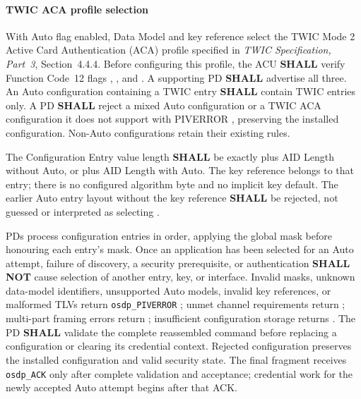\paragraph{TWIC ACA profile selection}
With Auto flag  enabled, Data Model  and key reference
 select the TWIC Mode 2 Active Card Authentication (ACA) profile
specified in \emph{TWIC Specification, Part~3}, Section~4.4.4. Before configuring
this profile, the ACU \textbf{SHALL} verify Function Code~12 flags ,
, and . A supporting PD \textbf{SHALL} advertise all three.
An Auto configuration containing a TWIC entry \textbf{SHALL} contain TWIC entries
only. A PD \textbf{SHALL} reject a mixed Auto configuration or a TWIC ACA
configuration it does not support with PIVERROR , preserving the
installed configuration. Non-Auto configurations retain their existing rules.

The Configuration Entry value length \textbf{SHALL} be exactly  plus AID
Length without Auto, or  plus AID Length with Auto. The key reference belongs
to that entry; there is no configured algorithm byte and no implicit key default.
The earlier Auto entry layout without the key reference \textbf{SHALL} be rejected,
not guessed or interpreted as selecting .

PDs process configuration entries in order, applying the global mask before honouring each
entry's mask. Once an application has been selected for an Auto attempt, failure of discovery,
a security prerequisite, or authentication \textbf{SHALL NOT} cause selection of another
entry, key, or interface. Invalid masks, unknown data-model identifiers, unsupported Auto
models, invalid key references, or
malformed TLVs return \texttt{osdp\_PIVERROR} ; unmet channel requirements
return ; multi-part framing errors return ; insufficient
configuration storage returns . The PD \textbf{SHALL} validate the complete
reassembled command before replacing a configuration or clearing its credential context.
Rejected configuration preserves the installed configuration and valid security state.
The final fragment receives \texttt{osdp\_ACK} only after complete validation and acceptance;
credential work for the newly accepted Auto attempt begins after that ACK.

